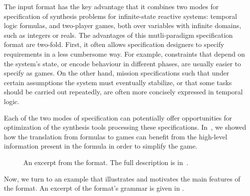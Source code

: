 The \issy input format has the key advantage that it combines two modes for specification of synthesis problems for infinite-state reactive systems: temporal logic formulas,  and two-player games, both over variables with infinite domains, such as integers or reals.  
The advantages of this mutli-paradigm specification format are two-fold.
First,  it often allows specification designers to specify requirements in a less cumbersome way.  
For example,  constraints that  depend on the system's state, or encode behaviour in different phases,  are usually easier to specify as games.  On the other hand, mission specifications such that under certain assumptions the system must eventually stabilize, or that some tasks should be carried out repeatedly, are often more concisely expressed in temporal logic.  



Each of the two modes of specification can potentially offer opportunities for optimization of the synthesis tools processing these specifications. 
In~\cite{HeimD25}, we showed how the translation from \rpltl{} formulas  to  games can benefit from the high-level information present in the formula in order to simplify the  game. 


\begin{figure}[b!]
\begin{center}

\end{center}
\caption{An excerpt from the \issy  format.  The full description is in~.}
\label{fig:issy-grammar-part}
\end{figure}





Now, we turn to an example that illustrates and motivates the main features of the \issy format.
An excerpt of the format's grammar is given in .


